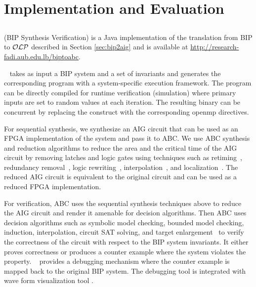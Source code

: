 \section{Implementation and Evaluation}
\label{sec:implem}

\subsection{\biptool{}} \label{chap:implementation:bip}
\biptool{} (BIP Synthesis Verification) is a Java implementation of the translation from BIP to $\mathcal{OLP}$ described in Section \ref{sec:bip2aig} and is available at \href{http://research-fadi.aub.edu.lb/biptoabc}{http://research-fadi.aub.edu.lb/biptoabc}. 

\biptool~ takes as input a BIP system and a set of invariants
and generates the corresponding \caig{} program with a system-specific 
execution framework. 
The \caig program can be directly compiled for runtime verification (simulation)
where primary inputs are set to random values at each iteration. 
The resulting binary can be concurrent by replacing the 
 construct with the corresponding openmp directives. 

For sequential synthesis, we synthesize an AIG 
circuit that can be used as an FPGA implementation of the system
and pass it to ABC. 
We use ABC synthesis and reduction algorithms to reduce the area and the critical
time of the AIG circuit by 
removing latches and logic gates using techniques such as 
retiming~\cite{KuBa01}, 
redundancy removal~\cite{HmBPK05,KuMP01,BjesseC00,aziz-fmsd-00}, 
logic rewriting~\cite{BjBo04}, interpolation~\cite{McMillan03}, 
and localization~\cite{Wang03}. 
The reduced AIG circuit is equivalent to the original circuit and can be used
as a reduced FPGA implementation. 


For verification, 
ABC uses the sequential synthesis techniques above to reduce the 
AIG circuit and render it amenable for decision algorithms. 
Then ABC uses decision algorithms such as 
symbolic model checking, bounded model checking, induction, 
interpolation, circuit SAT solving, 
and target enlargement~\cite{MoGS00,MoMZ01,HoSH00,BaKuAb02,Hari05expert}
to verify the correctness of the circuit with respect to the BIP system invariants.
It either proves correctness or produces a counter example where the system 
violates the property. 
\biptool~ provides a debugging mechanism where the counter example is mapped back 
to the original BIP system. 
The debugging tool is integrated with wave form visualization 
tool \cite{bybell2010gtkwave}.  

